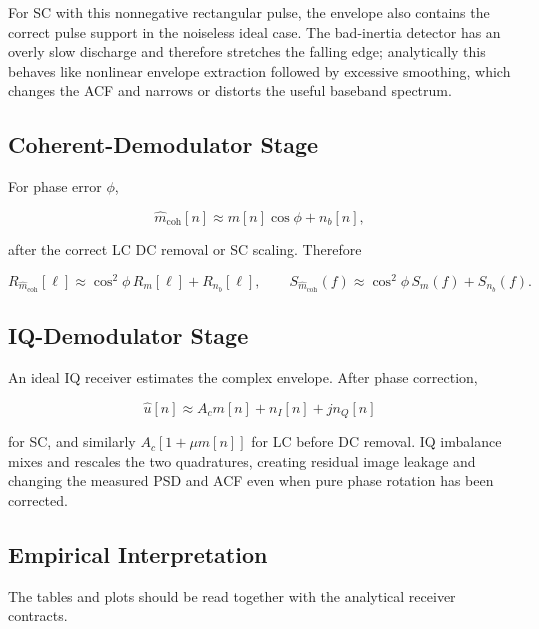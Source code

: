 \documentclass[11pt]{article}
\begin{document}
For SC with this nonnegative rectangular pulse, the envelope also contains the correct pulse support in the noiseless ideal case. The bad-inertia detector has an overly slow discharge and therefore stretches the falling edge; analytically this behaves like nonlinear envelope extraction followed by excessive smoothing, which changes the ACF and narrows or distorts the useful baseband spectrum.

\subsection{Coherent-Demodulator Stage}

For phase error $\phi$,

\[
\widehat{m}_{\mathrm{coh}}[n]\approx m[n]\cos\phi + n_b[n],
\]

after the correct LC DC removal or SC scaling. Therefore

\[
R_{\widehat{m}_{\mathrm{coh}}}[\ell]\approx \cos^2\phi\,R_m[\ell]+R_{n_b}[\ell],
\qquad
S_{\widehat{m}_{\mathrm{coh}}}(f)\approx \cos^2\phi\,S_m(f)+S_{n_b}(f).
\]

\subsection{IQ-Demodulator Stage}

An ideal IQ receiver estimates the complex envelope. After phase correction,

\[
\widehat{u}[n]\approx A_c m[n]+n_I[n]+j n_Q[n]
\]

for SC, and similarly $A_c[1+\mu m[n]]$ for LC before DC removal. IQ imbalance mixes and rescales the two quadratures, creating residual image leakage and changing the measured PSD and ACF even when pure phase rotation has been corrected.

\subsection{Empirical Interpretation}

The tables and plots should be read together with the analytical receiver contracts.
\end{document}
